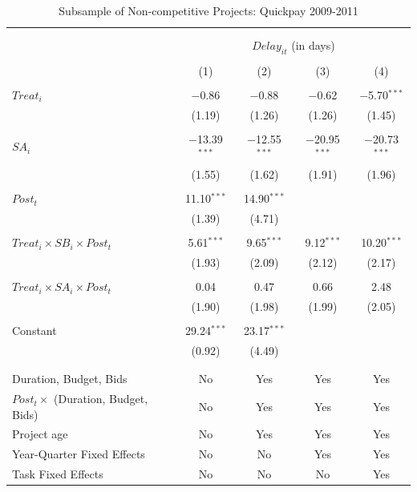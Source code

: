\documentclass[
]{article}
\begin{document}
\begin{table}[H] \centering 
  \caption{Subsample of Non-competitive Projects: Quickpay 2009-2011} 
  \label{} 
\small 
\begin{tabular}{@{\extracolsep{-2pt}}lcccc} 
\\[-1.8ex]\hline 
\hline \\[-1.8ex] 
\\[-1.8ex] & \multicolumn{4}{c}{$Delay_{it}$ (in days)} \\ 
\\[-1.8ex] & (1) & (2) & (3) & (4)\\ 
\hline \\[-1.8ex] 
 $Treat_i$ & $-$0.86 & $-$0.88 & $-$0.62 & $-$5.70$^{***}$ \\ 
  & (1.19) & (1.26) & (1.26) & (1.45) \\ 
  & & & & \\ 
 $SA_i$ & $-$13.39$^{***}$ & $-$12.55$^{***}$ & $-$20.95$^{***}$ & $-$20.73$^{***}$ \\ 
  & (1.55) & (1.62) & (1.91) & (1.96) \\ 
  & & & & \\ 
 $Post_t$ & 11.10$^{***}$ & 14.90$^{***}$ &  &  \\ 
  & (1.39) & (4.71) &  &  \\ 
  & & & & \\ 
 $Treat_i \times SB_i \times Post_t$ & 5.61$^{***}$ & 9.65$^{***}$ & 9.12$^{***}$ & 10.20$^{***}$ \\ 
  & (1.93) & (2.09) & (2.12) & (2.17) \\ 
  & & & & \\ 
 $Treat_i \times SA_i \times Post_t$ & 0.04 & 0.47 & 0.66 & 2.48 \\ 
  & (1.90) & (1.98) & (1.99) & (2.05) \\ 
  & & & & \\ 
 Constant & 29.24$^{***}$ & 23.17$^{***}$ &  &  \\ 
  & (0.92) & (4.49) &  &  \\ 
  & & & & \\ 
\hline \\[-1.8ex] 
Duration, Budget, Bids & No & Yes & Yes & Yes \\ 
$Post_t \times $  (Duration, Budget, Bids) & No & Yes & Yes & Yes \\ 
Project age & No & Yes & Yes & Yes \\ 
Year-Quarter Fixed Effects & No & No & Yes & Yes \\ 
Task Fixed Effects & No & No & No & Yes \\ 

\end{tabular}
\end{table}
\end{document}
